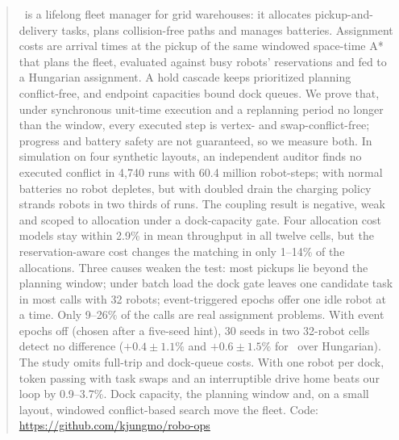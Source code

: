 \begin{abstract}
\sname\ is a lifelong fleet manager for grid warehouses: it allocates
pickup-and-delivery tasks, plans collision-free paths and manages batteries.
Assignment costs are arrival times at the pickup of the same windowed
space-time A* that plans the fleet, evaluated against busy robots'
reservations and fed to a Hungarian assignment. A hold cascade keeps
prioritized planning conflict-free, and endpoint capacities bound
dock queues. We prove that, under synchronous unit-time
execution and a replanning period no longer than the window, every executed
step is vertex- and swap-conflict-free; progress and
battery safety are not guaranteed, so we measure both. In simulation on
four synthetic layouts, an independent auditor finds no executed conflict in
4{,}740 runs with 60.4 million robot-steps; with normal batteries no robot
depletes, but with doubled drain the charging policy strands robots in two
thirds of runs. The coupling result is negative, weak and scoped to
allocation under a dock-capacity gate. Four
allocation cost models stay within 2.9\% in mean throughput in all twelve
cells, but the reservation-aware cost changes the matching in only 1--14\% of
the allocations. Three causes weaken the test: most pickups lie beyond the
planning window; under batch load the dock gate leaves one candidate task in
most calls with 32 robots; event-triggered epochs offer one idle robot at a
time. Only 9--26\% of the calls are real
assignment problems. With event epochs off (chosen after a five-seed hint), 30
seeds in two 32-robot cells detect no difference ($+0.4\pm1.1\%$ and
$+0.6\pm1.5\%$ for \sname\ over Hungarian). The study omits full-trip and dock-queue costs. With one robot per dock, token passing with task swaps
and an interruptible drive home beats our loop by 0.9--3.7\%. Dock capacity,
the planning window and, on a small layout, windowed conflict-based search move
the fleet. Code: \url{https://github.com/kjungmo/robo-ops}
\end{abstract}
